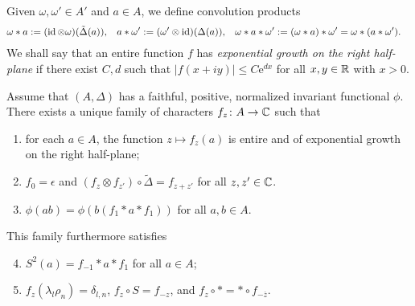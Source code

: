 Given $\omega,\omega' \in A'$ and $a \in A$, we define convolution
products
\begin{align*}
  \omega \ast a
&:= (\operatorname{id} \otimes \omega) (\tilde \Delta(a)), & a \ast
\omega'&:=(\omega' \otimes \operatorname{id})(\Delta(a)), & \omega \ast a \ast
\omega'&:= (\omega \ast a)\ast \omega' = \omega \ast (a \ast \omega').\end{align*}
We shall say that an entire function $f$ has \emph{exponential growth
  on the right half-plane} if there exist $C,d$ such that $|f(x+iy)|\leq
C\mathrm{e}^{dx}$  for all $x,y\in \mathbb{R}$ with $x>0$. 
\begin{Theorem} \label{thm:rep-characters}
  Assume that $(A,\Delta)$ has a faithful, positive, normalized
  invariant functional $\phi$.  There exists a unique family of characters
  $f_{z} \colon A\to \mathbb{C}$ such that
  \begin{enumerate}
  \item for each $a\in A$, the function $z\mapsto f_{z}(a)$ is entire
    and of exponential growth on the right half-plane;
  \item $f_{0} = \epsilon$ and $(f_{z} \otimes f_{z'}) \circ \tilde
    \Delta= f_{z+z'}$ for all $z,z' \in \mathbb{C}$.
  \item $\phi(ab)=\phi(b(f_{1} \ast a \ast f_{1}))$ for all $a,b\in A$.
  \end{enumerate}
  This family furthermore satisfies
  \begin{enumerate}\setcounter{enumi}{3}
  \item $S^{2}(a)=f_{-1} \ast a \ast f_{1}$ for all $a\in A$;
  \item $f_{z}(\lambda_{l}\rho_{n})=\delta_{l,n}$,  $f_{z} \circ S = f_{-z}$,
and    $f_{z} \circ \ast = \ast \circ f_{-\overline{z}}$.
\end{enumerate}
\end{Theorem}
